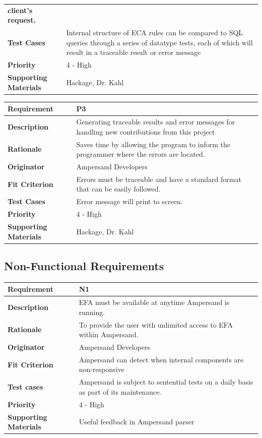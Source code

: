 \documentclass[12pt]{report}
\begin{document}
{{\begin{tabularx}{\textwidth}{>{\bfseries}C{3cm}X}
        client's request.
        \\ Test Cases & Internal structure of ECA rules can be compared to SQL 
        queries through a series of datatype tests, each of which will result 
        in a traceable result or error message
        \\	Priority & 4 - High
        \\	Supporting Materials & Hackage, Dr. Kahl
        \vspace{12pt}
    \end{tabularx}
}
{\setlength{\tabcolsep}{6pt} %
    \begin{tabularx}{\textwidth}{>{\bfseries}C{3cm}X}
        Requirement & P3 \\ 
        \midrule
        \endhead
        Description  & Generating traceable results and error messages for 
        handling new contributions from this project
        \\	Rationale & Saves time by allowing the program to inform the 
        programmer where the errors are located.
        \\	Originator & Ampersand Developers
        \\	Fit Criterion & Errors must be traceable and have a standard format 
        that can be easily followed.
        \\ Test Cases & Error message will print to screen.
        \\	Priority & 4 - High
        \\	Supporting Materials & Hackage, Dr. Kahl
        \vspace{12pt}
    \end{tabularx}
}

\subsection{Non-Functional Requirements}
{\setlength{\tabcolsep}{6pt} %
\begin{tabularx}{\textwidth}{>{\bfseries}C{3cm}X}
Requirement & N1 \\ 
\midrule
\endhead
Description  & EFA must be available at anytime Ampersand is running.
\\	Rationale & To provide the user with unlimited access to EFA within 
Ampersand.
\\	Originator & Ampersand Developers
\\	Fit Criterion & Ampersand can detect when internal components are 
non-responsive
\\ Test cases & Ampersand is subject to sentential tests on a daily basis as 
part of its maintenance.   
\\	Priority & 4 - High
\\	Supporting Materials & Useful feedback in Ampersand parser \cite{SB2011}
\vspace{12pt}
\end{tabularx}
}


}
\end{document}
